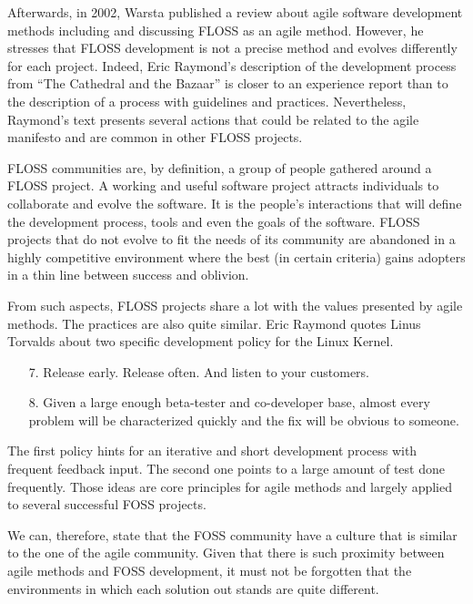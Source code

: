 \documentclass[lnbip]{svmultln}
\begin{document}
Afterwards, in 2002, Warsta \cite{warsta2002} published a review about
agile software development methods including and discussing FLOSS as
an agile method.  However, he stresses that FLOSS development is not a
precise method and evolves differently for each project. Indeed, Eric
Raymond's description of the development process from ``The Cathedral
and the Bazaar'' \cite{raymond1999} is closer to an experience report
than to the description of a process with guidelines and
practices. Nevertheless, Raymond's text presents several actions that
could be related to the agile manifesto \cite{url:agilemanifesto} and
are common in other FLOSS projects.

FLOSS communities are, by definition, a group of people gathered
around a FLOSS project. A working and useful software project attracts
individuals to collaborate and evolve the
software\cite{crowston2002}. It is the people's interactions that will
define the development process, tools and even the goals of the
software. FLOSS projects that do not evolve to fit the needs of its
community are abandoned in a highly competitive environment where the
best (in certain criteria) gains adopters in a thin line between
success and oblivion.

From such aspects, FLOSS projects share a lot with the values
presented by agile methods. The practices are also quite similar. Eric
Raymond quotes Linus Torvalds about two specific development policy
for the Linux Kernel.
\begin{enumerate}
\item[7.] Release early. Release often. And listen to your customers.
\item[8.] Given a large enough beta-tester and co-developer base,
  almost every problem will be characterized quickly and the fix will
  be obvious to someone.
\end{enumerate}

The first policy hints for an iterative and short development process
with frequent feedback input. The second one points to a large amount
of test done frequently. Those ideas are core principles for agile
methods and largely applied to several successful FOSS projects.

We can, therefore, state that the FOSS community have a culture that
is similar to the one of the agile community. Given that there is such
proximity between agile methods and FOSS development, it must not be
forgotten that the environments in which each solution out stands are
quite different.
\end{document}
